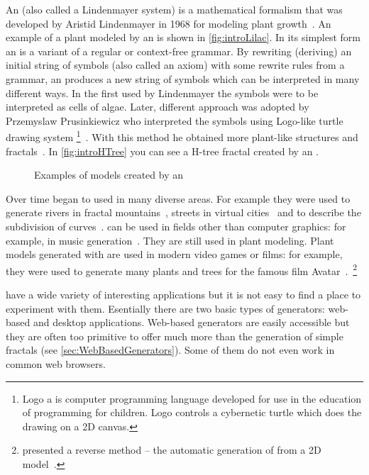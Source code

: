 
\label{sec:Introduction}

An \lsystem (also called a Lindenmayer system) is a mathematical formalism that was developed by Aristid Lindenmayer in 1968 for modeling plant growth~\cite{Lin68}.
An example of a plant modeled by an \lsystem is shown in \autoref{fig:introLilac}.
In its simplest form an \lsystem is a variant of a regular or \mbox{context-free} grammar.
By rewriting (deriving) an initial string of symbols (also called an axiom) with some rewrite rules from a grammar, an \lsystem produces a new string of symbols which can be interpreted in many different ways.
In the first \lsystems used by Lindenmayer the symbols were to be interpreted as cells of algae.
Later, different approach was adopted by Przemyslaw Prusinkiewicz who interpreted the \lsystem symbols using \mbox{Logo-like} turtle drawing system%
	\footnote{Logo a is computer programming language developed for use in the education of programming for children.
	Logo controls a cybernetic turtle which does the drawing on a 2D canvas.}~\cite{Pru85}.
With this method he obtained more plant-like structures and fractals~\cite{CD93}.
In \autoref{fig:introHTree} you can see a H-tree fractal created by an \lsystem.

\begin{figure}[h!]
	 \hfill
	\caption{Examples of models created by an \lsystem}
\end{figure}


Over time \lsystems began to used in many diverse areas.
For example they were used to generate rivers in fractal mountains~\cite{PH93}, streets in virtual cities~\cite{PM01} and to describe the subdivision of curves~\cite{PSSK03}.
\lsystems can be used in fields other than computer graphics: for example, in music generation~\cite{HCJ99, Man06}.
They are still used in plant modeling.
Plant models generated with \lsystems are used in modern video games or films: for example, they were used to generate many plants and trees for the famous film Avatar~\cite{Wor08, Dun10}.~\footnote{\citeauthor{SBM10} presented a reverse method -- the automatic generation of \lsystems from a 2D model~\cite{SBM10}.}

\lsystems have a wide variety of interesting applications but it is not easy to find a place to experiment with them.
Esentially there are two basic types of \lsystem generators: web-based and desktop applications.
Web-based \lsystem generators are easily accessible but they are often too primitive to offer much more than the generation of simple fractals (see \autoref{sec:WebBasedGenerators}).
Some of them do not even work in common web browsers.

